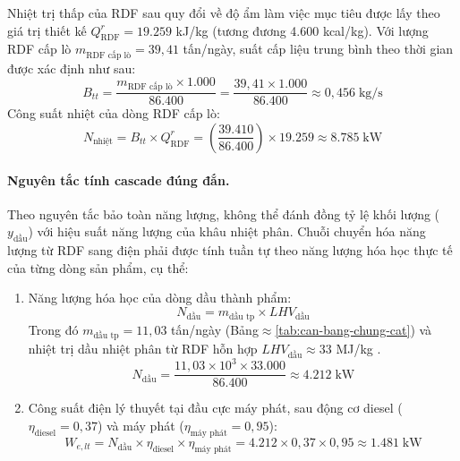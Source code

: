 \documentclass[../main.tex]{subfiles}
\begin{document}
Nhiệt trị thấp của RDF sau quy đổi về độ ẩm làm việc mục tiêu được lấy theo giá trị thiết kế $Q_{\text{RDF}}^r = 19.259$ kJ/kg (tương đương 4.600 kcal/kg). Với lượng RDF cấp lò $m_{\text{RDF cấp lò}} = 39{,}41$ tấn/ngày, suất cấp liệu trung bình theo thời gian được xác định như sau:
\begin{equation}
  B_{tt} = \frac{m_{\text{RDF cấp lò}} \times 1.000}{86.400}
         = \frac{39{,}41 \times 1.000}{86.400}
         \approx 0{,}456 \;\text{kg/s}
\end{equation}
Công suất nhiệt của dòng RDF cấp lò:
\begin{equation}
  N_{\text{nhiệt}} = B_{tt} \times Q_{\text{RDF}}^r
                   = \left( \frac{39.410}{86.400} \right) \times 19.259
                   \approx 8.785 \;\text{kW}
\end{equation}

\paragraph*{Nguyên tắc tính cascade đúng đắn.} Theo nguyên tắc bảo toàn năng lượng, không thể đánh đồng tỷ lệ khối lượng ($y_{\text{dầu}}$) với hiệu suất năng lượng của khâu nhiệt phân. Chuỗi chuyển hóa năng lượng từ RDF sang điện phải được tính tuần tự theo năng lượng hóa học thực tế của từng dòng sản phẩm, cụ thể:
\begin{enumerate}
  \item Năng lượng hóa học của dòng dầu thành phẩm:
        \begin{equation}
          N_{\text{dầu}} = m_{\text{dầu tp}} \times LHV_{\text{dầu}}
        \end{equation}
        Trong đó $m_{\text{dầu tp}} = 11{,}03$ tấn/ngày (Bảng$\approx$\ref{tab:can-bang-chung-cat}) và nhiệt trị dầu nhiệt phân từ RDF hỗn hợp $LHV_{\text{dầu}} \approx 33$ MJ/kg \cite{Sharuddin2016,Williams2007}.
        \begin{equation}
          N_{\text{dầu}} = \frac{11{,}03 \times 10^3 \times 33.000}{86.400} \approx 4.212 \;\text{kW}
        \end{equation}
  \item Công suất điện lý thuyết tại đầu cực máy phát, sau động cơ diesel ($\eta_{\text{diesel}} = 0{,}37$) và máy phát ($\eta_{\text{máy phát}} = 0{,}95$):
        \begin{equation}
          W_{e,lt} = N_{\text{dầu}} \times \eta_{\text{diesel}} \times \eta_{\text{máy phát}}
                   = 4.212 \times 0{,}37 \times 0{,}95
                   \approx 1.481 \;\text{kW}
        \end{equation}
\end{enumerate}
\end{document}
